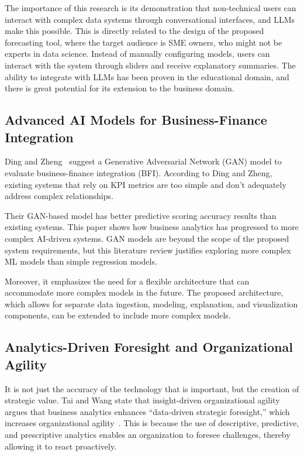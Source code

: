 \documentclass[12pt]{article}
\begin{document}
The importance of this research is its demonstration that non-technical users can interact with complex data systems through conversational interfaces, and LLMs make this possible. This is directly related to the design of the proposed forecasting tool, where the target audience is SME owners, who might not be experts in data science. Instead of manually configuring models, users can interact with the system through sliders and receive explanatory summaries. The ability to integrate with LLMs has been proven in the educational domain, and there is great potential for its extension to the business domain.

\subsection{Advanced AI Models for Business-Finance Integration}
Ding and Zheng~\cite{10.1145/3745238.3745246} suggest a Generative Adversarial Network (GAN) model to evaluate business-finance integration (BFI). According to Ding and Zheng, existing systems that rely on KPI metrics are too simple and don't adequately address complex relationships.

Their GAN-based model has better predictive scoring accuracy results than existing systems. This paper shows how business analytics has progressed to more complex AI-driven systems. GAN models are beyond the scope of the proposed system requirements, but this literature review justifies exploring more complex ML models than simple regression models.

Moreover, it emphasizes the need for a flexible architecture that can accommodate more complex models in the future. The proposed architecture, which allows for separate data ingestion, modeling, explanation, and visualization components, can be extended to include more complex models.

\subsection{Analytics-Driven Foresight and Organizational Agility}
It is not just the accuracy of the technology that is important, but the creation of strategic value. Tai and Wang state that insight-driven organizational agility argues that business analytics enhances “data-driven strategic foresight,” which increases organizational agility~\cite{10.1145/3624875.3624885}. This is because the use of descriptive, predictive, and prescriptive analytics enables an organization to foresee challenges, thereby allowing it to react proactively. 
\end{document}
